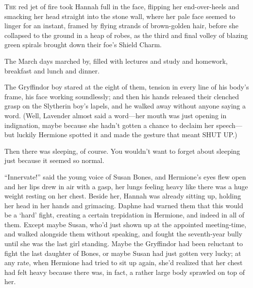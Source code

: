 
\begin{em}
\lettrine{T}{he} red jet 
of fire took Hannah full in the face, flipping her end-over-heels and smacking 
her head straight into the stone wall, where her pale face seemed to linger for 
an instant, framed by flying strands of brown-golden hair, before she collapsed 
to the ground in a heap of robes, as the third and final volley of blazing 
green spirals brought down their foe's Shield Charm.
\end{em}

The March days marched by, filled with lectures and study and homework, 
breakfast and lunch and dinner.

\begin{em}
The Gryffindor boy stared at the eight of them, tension in every line of 
his body's frame, his face working soundlessly; and then his hands released 
their clenched grasp on the Slytherin boy's lapels, and he walked away without 
anyone saying a word. (Well, Lavender almost said a word---her mouth was just 
opening in indignation, maybe because she hadn't gotten a chance to declaim her 
speech---but luckily Hermione spotted it and made the gesture that meant SHUT 
UP.)
\end{em}

Then there was sleeping, of course. You wouldn't want to forget about sleeping 
just because it seemed so normal.

\begin{em}
``Innervate!'' said the young voice of Susan Bones, and Hermione's eyes 
flew open and her lips drew in air with a gasp, her lungs feeling heavy like 
there was a huge weight resting on her chest. Beside her, Hannah was already 
sitting up, holding her head in her hands and grimacing. Daphne had warned them 
that this would be a `hard' fight, creating a certain trepidation in Hermione, 
and indeed in all of them. Except maybe Susan, who'd just shown up at the 
appointed meeting-time, and walked alongside them without speaking, and fought 
the seventh-year bully until she was the last girl standing. Maybe the 
Gryffindor had been reluctant to fight the last daughter of Bones, or maybe 
Susan had just gotten very lucky; at any rate, when Hermione had tried to sit 
up again, she'd realized that her chest had felt heavy because there was, in 
fact, a rather large body sprawled on top of her.
\end{em}

